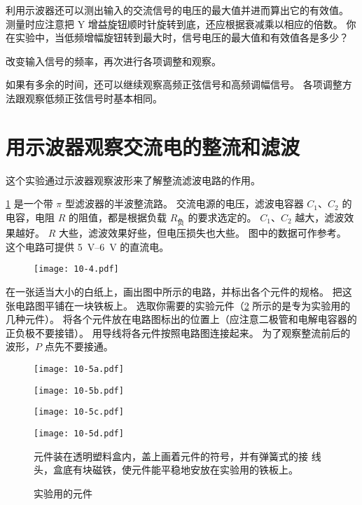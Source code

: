 利用示波器还可以测出输入的交流信号的电压的最大值并进而算出它的有效值。
测量时应注意把 Y 增益旋钮顺时针旋转到底，还应根据衰减乘以相应的倍数。
你在实验中，当低频增幅旋钮转到最大时，信号电压的最大值和有效值各是多少？

改变输入信号的频率，再次进行各项调整和观察。

如果有多余的时间，还可以继续观察高频正弦信号和高频调幅信号。
各项调整方法跟观察低频正弦信号时基本相同。

\section{用示波器观察交流电的整流和滤波}\label{sec:rectifier_filter}

这个实验通过示波器观察波形来了解整流滤波电路的作用。

\cref{fig:10-4} 是一个带 $\pi$ 型滤波器的半波整流路。
交流电源的电压，滤波电容器 $C_1$、$C_2$ 的电容，电阻 $R$ 的阻值，都是根据负载 $R_{\text{负}}$ 的要求选定的。
$C_1$、$C_2$ 越大，滤波效果越好。
$R$ 大些，滤波效果好些，但电压损失也大些。
图中的数据可作参考。
这个电路可提供 \qtyrange{5}{6}{V} 的直流电。
\begin{figure}
  \texttt{[image: 10-4.pdf]}
  \caption{}\label{fig:10-4}
\end{figure}

在一张适当大小的白纸上，画出图中所示的电路，并标出各个元件的规格。
把这张电路图平铺在一块铁板上。
选取你需要的实验元件（\cref{fig:10-5} 所示的是专为实验用的几种元件）。
将各个元件放在电路图标出的位置上（应注意二极管和电解电容器的正负极不要接错）。
用导线将各元件按照电路图连接起来。
为了观察整流前后的波形，$P$ 点先不要接通。

\begin{figure}
  \begin{minipage}{0.23\linewidth}\centering
    \texttt{[image: 10-5a.pdf]}
  \end{minipage}
  \begin{minipage}{0.23\linewidth}\centering
    \texttt{[image: 10-5b.pdf]}
  \end{minipage}
  \begin{minipage}{0.23\linewidth}\centering
    \texttt{[image: 10-5c.pdf]}
  \end{minipage}
  \begin{minipage}{0.23\linewidth}\centering
    \texttt{[image: 10-5d.pdf]}
  \end{minipage}
  {\par\footnotesize 元件装在透明塑料盒内，盖上画着元件的符号，并有弹簧式的接
线头，盒底有块磁铁，使元件能平稳地安放在实验用的铁板上。}
  \caption{实验用的元件}\label{fig:10-5}
\end{figure}

